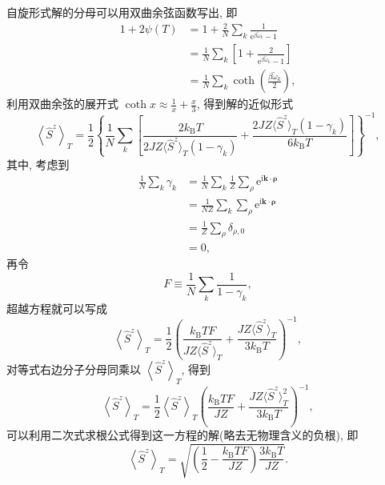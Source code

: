 自旋形式解的分母可以用双曲余弦函数写出, 即
  \begin{align}
        1+2\psi(T)&=1+\frac{2}{N}\sum_k\frac{1}{\mathrm{e}^{\beta\tilde{\omega}_k}-1}\nonumber\\
        &=\frac{1}{N}\sum_k\left[ 1+\frac{2}{\mathrm{e}^{\beta\tilde{\omega}_k}-1} \right]\nonumber\\
        &=\frac{1}{N}\sum_k\coth\left( \frac{\beta\tilde{\omega}_k}{2} \right),
    \end{align}
利用双曲余弦的展开式 $\coth x\approx \frac{1}{x}+\frac{x}{3}$, 得到解的近似形式
\begin{equation}
    \left\langle \hat{S}^z \right\rangle_T=\frac{1}{2} \left\{ \frac{1}{N}\sum_k\left[ \frac{2k_{\mathrm{B}}T}{ 2JZ\langle \hat{S}^z \rangle_T(1-\gamma_k)}+\frac{2JZ\langle \hat{S}^z \rangle_T(1-\gamma_k)}{6k_{\mathrm{B}}T} \right] \right\}^{-1},
\end{equation}
其中, 考虑到 
  \begin{align}
        \frac{1}{N}\sum_k\gamma_k&=\frac{1}{N}\sum_k\frac{1}{Z}\sum_\rho \mathrm{e}^{\mathrm{i}\boldsymbol{k}\cdot \boldsymbol{\rho}}\nonumber\\
        &=\frac{1}{NZ}\sum_k\sum_\rho \mathrm{e}^{\mathrm{i}\boldsymbol{k}\cdot \boldsymbol{\rho}}\nonumber\\
        &=\frac{1}{Z}\sum_{\rho}\delta_{\rho,0}\nonumber\\
        &=0,
    \end{align}
再令 
\begin{equation}
    F\equiv \frac{1}{N}\sum_k\frac{1}{1-\gamma_k},
\end{equation}
超越方程就可以写成
\begin{equation}
    \left\langle \hat{S}^z \right\rangle_T=\frac{1}{2}\left( \frac{k_{\mathrm{B}}TF}{JZ\langle \hat{S}^z \rangle_T}+\frac{JZ\langle \hat S^z \rangle_T}{3k_{\mathrm{B}}T} \right)^{-1},
\end{equation}
对等式右边分子分母同乘以 $\left\langle \hat{S}^z \right\rangle_T$, 得到
\begin{equation}
    \left\langle \hat{S}^z \right\rangle_T=\frac{1}{2}\left\langle \hat{S}^z \right\rangle_T \left( \frac{k_{\mathrm{B}}TF}{JZ}+\frac{JZ\langle\hat{S}^z\rangle_T^2}{3k_{\mathrm{B}}T} \right)^{-1},
\end{equation}
可以利用二次式求根公式得到这一方程的解(略去无物理含义的负根), 即
\begin{equation}
    \left\langle \hat{S}^z \right\rangle_T=\sqrt{\left( \frac{1}{2}-\frac{k_{\mathrm{B}}TF}{JZ} \right)\frac{3k_{\mathrm{B}}T}{JZ}}.
\end{equation}


